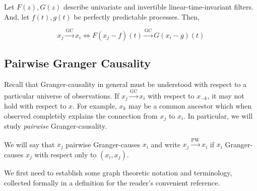 \documentclass[12pt]{article}
\def\gc{\overset{\text{GC}}{\rightarrow}}  %
\def\pwgc{\overset{\text{PW}}{\rightarrow}}  %
\begin{document}
\begin{corollary}
  Let $F(z), G(z)$ describe univariate and invertible
  linear-time-invariant filters.  And, let $f(t), g(t)$ be perfectly
  predictable processes.  Then,

  \begin{equation}
    x_j \gc x_i \iff F(x_j - f)(t) \gc G(x_i - g)(t)
  \end{equation}
\end{corollary}

\subsection{Pairwise Granger Causality}
Recall that Granger-causality in general must be understood with
respect to a particular universe of observations.  If $x_j \gc x_i$
with respect to $x_{-k}$, it may not hold with respect to $x$.  For
example, $x_k$ may be a common ancestor which when observed completely
explains the connection from $x_j$ to $x_i$.  In particular, we will
study \textit{pairwise} Granger-causality.

\begin{definition}
  We will say that $x_j$ pairwise Granger-causes $x_i$ and write
  $x_j \pwgc x_i$ if $x_i$ Granger-causes $x_j$ with respect only to
  $(x_i, x_j)$.
\end{definition}


We first need to establish some graph theoretic notation and
terminology, collected formally in a definition for the reader's
convenient reference.
\end{document}

